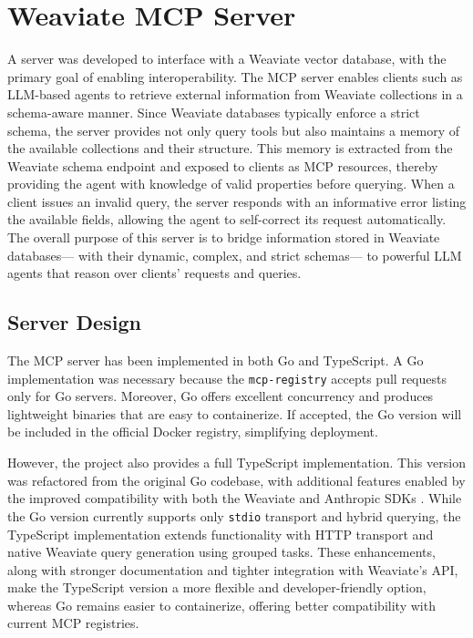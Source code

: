 \section{Weaviate MCP Server}\label{sec:weaviate-mcp-server}
A  server was developed to interface with a Weaviate vector database, with the primary goal of enabling interoperability. The MCP server enables clients such as \gls{LLM}-based agents to retrieve external information from Weaviate collections in a schema-aware manner. Since Weaviate databases typically enforce a strict schema, the server provides not only query tools but also maintains a memory of the available collections and their structure. This memory is extracted from the Weaviate schema endpoint and exposed to clients as MCP resources, thereby providing the agent with knowledge of valid properties before querying. When a client issues an invalid query, the server responds with an informative error listing the available fields, allowing the agent to self-correct its request automatically. The overall purpose of this server is to bridge information stored in Weaviate databases— with their dynamic, complex, and strict schemas— to powerful \gls{LLM} agents that reason over clients' requests and queries.

\subsection{Server Design}

The MCP server has been implemented in both Go and TypeScript. A Go implementation was necessary because the \texttt{mcp-registry} accepts pull requests only for Go servers. Moreover, Go offers excellent concurrency and produces lightweight binaries that are easy to containerize. If accepted, the Go version will be included in the official Docker registry, simplifying deployment.

However, the project also provides a full TypeScript implementation. This version was refactored from the original Go codebase, with additional features enabled by the improved compatibility with both the Weaviate and Anthropic SDKs \cite{stainless_mcp_comparison}. While the Go version currently supports only \texttt{stdio} transport and hybrid querying, the TypeScript implementation extends functionality with HTTP transport and native Weaviate query generation using grouped tasks. These enhancements, along with stronger documentation and tighter integration with Weaviate's API, make the TypeScript version a more flexible and developer-friendly option, whereas Go remains easier to containerize, offering better compatibility with current \gls{MCP} registries.

